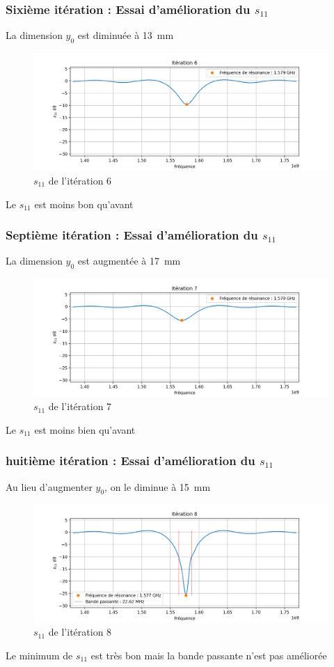 \documentclass[Deriaz_Traiber_Labo02.tex]{subfiles}
\begin{document}
\subsubsection{Sixième itération : Essai d'amélioration du $s_{11}$}
La dimension $y_0$ est diminuée à \SI{13}{\milli\meter}
\begin{figure}[H]
\centering
\includegraphics[width=15cm]{../Calculs/run_id_ceramique_6.png}
\caption[caption]{$s_{11}$ de l'itération 6}
\end{figure}
Le $s_{11}$ est moins bon qu'avant
\subsubsection{Septième itération : Essai d'amélioration du $s_{11}$}
La dimension $y_0$ est augmentée à \SI{17}{\milli\meter}
\begin{figure}[H]
\centering
\includegraphics[width=15cm]{../Calculs/run_id_ceramique_7.png}
\caption[caption]{$s_{11}$ de l'itération 7}
\end{figure}
Le $s_{11}$ est moins bien qu'avant
\pagebreak
\subsubsection{huitième itération : Essai d'amélioration du $s_{11}$}
Au lieu d'augmenter $y_0$, on le diminue à \SI{15}{\milli\meter}
\begin{figure}[H]
\centering
\includegraphics[width=15cm]{../Calculs/run_id_ceramique_8.png}
\caption[caption]{$s_{11}$ de l'itération 8}
\end{figure}
Le minimum de $s_{11}$ est très bon mais la bande passante n'est pas améliorée
\end{document}

